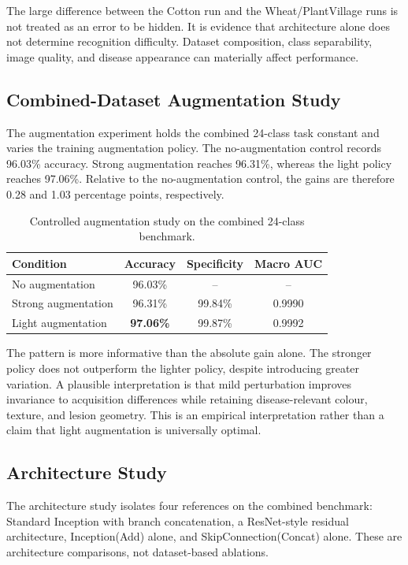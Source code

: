 \documentclass[a4paper,fleqn]{cas-dc}
\begin{document}
The large difference between the Cotton run and the Wheat/PlantVillage runs is not treated as an error to be hidden. It is evidence that architecture alone does not determine recognition difficulty. Dataset composition, class separability, image quality, and disease appearance can materially affect performance.

\subsection{Combined-Dataset Augmentation Study}
The augmentation experiment holds the combined 24-class task constant and varies the training augmentation policy. The no-augmentation control records 96.03\% accuracy. Strong augmentation reaches 96.31\%, whereas the light policy reaches 97.06\%. Relative to the no-augmentation control, the gains are therefore 0.28 and 1.03 percentage points, respectively.

\begin{table}[!t]
\centering
\caption{Controlled augmentation study on the combined 24-class benchmark.}
\label{tab:augresults}
\begin{tabular}{lccc}
\toprule
Condition & Accuracy & Specificity & Macro AUC \\
\midrule
No augmentation & 96.03\% & -- & -- \\
Strong augmentation & 96.31\% & 99.84\% & 0.9990 \\
Light augmentation & \textbf{97.06\%} & 99.87\% & 0.9992 \\
\bottomrule
\end{tabular}
\end{table}

The pattern is more informative than the absolute gain alone. The stronger policy does not outperform the lighter policy, despite introducing greater variation. A plausible interpretation is that mild perturbation improves invariance to acquisition differences while retaining disease-relevant colour, texture, and lesion geometry. This is an empirical interpretation rather than a claim that light augmentation is universally optimal.

\subsection{Architecture Study}
The architecture study isolates four references on the combined benchmark: Standard Inception with branch concatenation, a ResNet-style residual architecture, Inception(Add) alone, and SkipConnection(Concat) alone. These are architecture comparisons, not dataset-based ablations.
\end{document}
